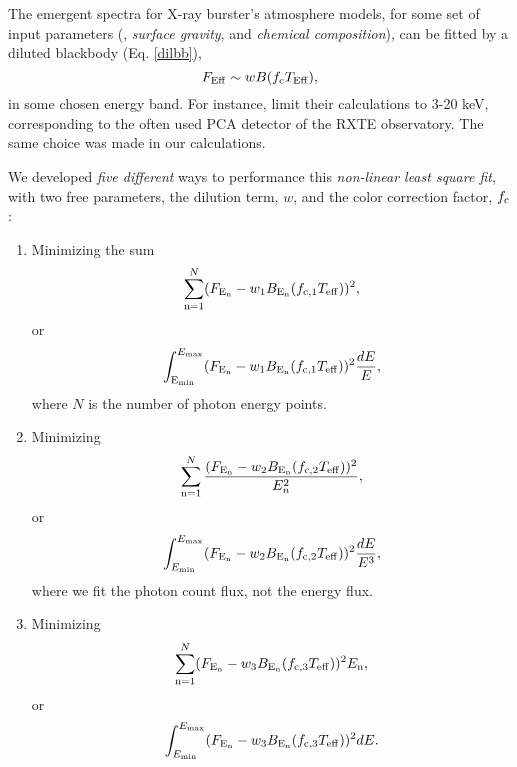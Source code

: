 {\quad  

The emergent spectra for X-ray burster's atmosphere models, for some set of input parameters (, {\it surface gravity}, and {\it chemical composition}), can  be fitted by a  diluted blackbody (Eq. \ref{dilbb}),
\begin{equation}
 F_{\rm Eff} \sim w B (f_{\rm c} T_{\rm Eff}),
 \label{fe}
\end{equation}
in some chosen energy band. For instance, \cite{SPW10}  limit their calculations to 3-20 keV, corresponding to the often used PCA detector of the RXTE observatory. The same choice was made in our  calculations.

\quad 


We developed {\it five different} ways to performance this  {\it non-linear least square fit},  with two free parameters, the  dilution term, $w$, and the color correction factor, $f_{\rm c}$:

\begin{enumerate}
 \item Minimizing the sum
 \begin{equation}
  \sum_{\rm n=1}^N(F_{\rm E_n} - w_1 B_{\rm E_n}(f_{\rm c,1}T_{\rm eff}))^2,
  \label{eqfit1}
 \end{equation}
   or
 \begin{equation*}
  \int_{\rm E_{\rm min}}^{E_{\rm max}}  (F_{\rm E_n} - w_1 B_{\rm E_n}(f_{\rm
c,1}T_{\rm eff}))^2
\frac{dE}{E},
 \end{equation*}
where $N$ is the number of photon energy points.

\quad


\item Minimizing
 \begin{equation*}
  \sum_{\rm n=1}^N  \frac{(F_{\rm E_n} - w_2 B_{\rm E_n}(f_{\rm c,2}T_{\rm
eff}))^2}{E_n^2},
 \end{equation*}
  or
 \begin{equation*}
  \int_{E_{\rm min}}^{E_{\rm max}}  (F_{\rm E_n} - w_2
B_{\rm E_n}(f_{\rm c,2}T_{\rm eff}))^2
\frac{dE}{E^3},
 \end{equation*}
 where we fit the photon count flux, not the energy flux.



\quad


 \item Minimizing
  \begin{equation*}
  \sum_{\rm n=1}^N  (F_{\rm E_n} - w_3 B_{\rm E_n}(f_{\rm c,3}T_{\rm
eff}))^2E_{\rm n},
 \end{equation*}
 or
 \begin{equation*}
  \int_{E_{\rm min}}^{E_{\rm max}}  (F_{\rm E_n} - w_3
B_{\rm E_n}(f_{\rm c,3}T_{\rm eff}))^2 dE.
 \end{equation*}
 

\end{enumerate}}

